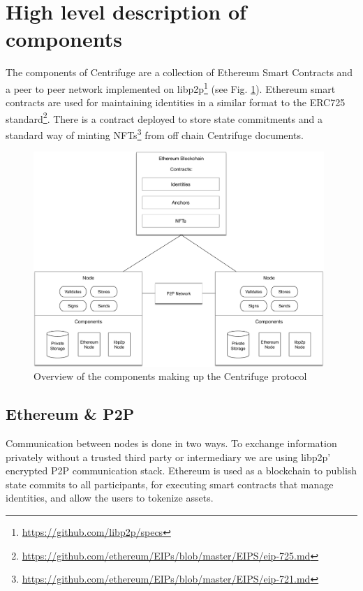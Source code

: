 \section{High level description of components}

The components of Centrifuge are a collection of Ethereum Smart Contracts and a peer to peer network implemented on libp2p\footnote{\url{https://github.com/libp2p/specs}} (see Fig. \ref{fig:high_level_architecture}). Ethereum smart contracts are used for maintaining identities in a similar format to the ERC725 standard\footnote{\url{https://github.com/ethereum/EIPs/blob/master/EIPS/eip-725.md}}. There is a contract deployed to store state commitments and a standard way of minting NFTs\footnote{\url{https://github.com/ethereum/EIPs/blob/master/EIPS/eip-721.md}} from off chain Centrifuge documents.
\begin{figure}[thpb]
  \centering
  \includegraphics[width=11cm]{img/high_level_architecture.pdf}
  \caption{Overview of the components making up the Centrifuge protocol} 
  \label{fig:high_level_architecture}
\end{figure}

\subsection{Ethereum \& P2P}
Communication between nodes is done in two ways. To exchange information privately without a trusted third party or intermediary we are using libp2p' encrypted P2P communication stack. Ethereum is used as a blockchain to publish state commits to all participants, for executing smart contracts that manage identities, and allow the users to tokenize assets.

